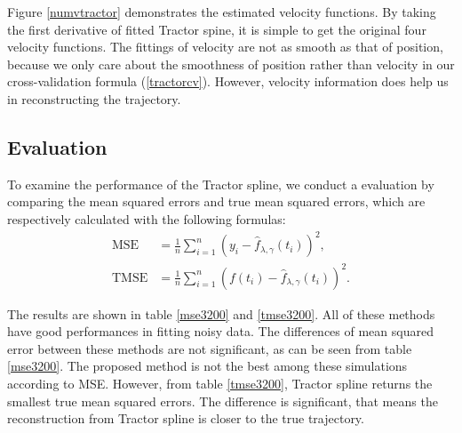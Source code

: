 Figure \ref{numvtractor} demonstrates the estimated velocity functions. By taking the first derivative of fitted Tractor spine, it is simple to get the original four velocity functions. The fittings of velocity are not as smooth as that of position, because we only care about the smoothness of position rather than velocity in our cross-validation formula (\ref{tractorcv}). However, velocity information does help us in reconstructing the trajectory.



\subsection{Evaluation}

To examine the performance of the Tractor spline, we conduct a evaluation by comparing the mean squared errors and true mean squared errors, which are respectively calculated with the following formulas: 
\begin{align}
\mbox{MSE}&= \frac{1}{n} \sum_{i=1}^{n} \left( y_i-\hat{f}_{\lambda,\gamma}(t_i) \right)^2,\\
\mbox{TMSE}&= \frac{1}{n} \sum_{i=1}^{n} \left( f(t_i)-\hat{f}_{\lambda,\gamma}(t_i) \right)^2.
\end{align}



The results are shown in table \ref{mse3200} and \ref{tmse3200}. All of these methods have good performances in fitting noisy data. The differences of mean squared error between these methods are not significant, as can be seen from table \ref{mse3200}. The proposed method is not the best among these simulations according to MSE. However, from table \ref{tmse3200}, Tractor spline returns the smallest true mean squared errors. The difference is significant, that means the reconstruction from Tractor spline is closer to the true trajectory. 
 

